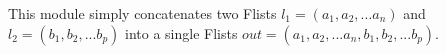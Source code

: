 This module simply concatenates two Flists 
$l_1=(a_1,a_2,...a_n)$ and $l_2=(b_1,b_2,...b_p)$ into
a single Flists
$out=(a_1,a_2,...a_n,b_1,b_2,...b_p)$.
